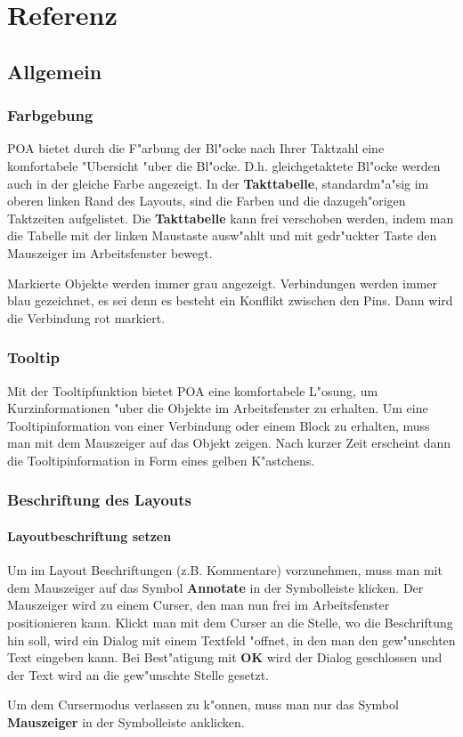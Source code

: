 \documentclass[a4paper,titlepage,12pt,ngerman]{scrbook}
\begin{document}
\chapter{Referenz}

\section{Allgemein}
\subsection{Farbgebung}
POA bietet durch die F"arbung der Bl"ocke nach Ihrer Taktzahl eine komfortabele "Ubersicht "uber die Bl"ocke. D.h. gleichgetaktete Bl"ocke werden auch in der gleiche Farbe angezeigt.\newline
In der {\bf Takttabelle}, standardm"a"sig im oberen linken Rand des Layouts, sind die Farben und die dazugeh"origen Taktzeiten aufgelistet. Die {\bf Takttabelle} kann frei verschoben werden, indem man die Tabelle mit der linken Maustaste ausw"ahlt und mit gedr"uckter Taste den Mauszeiger im Arbeitsfenster bewegt.\par
Markierte Objekte werden immer grau angezeigt.\newline
Verbindungen werden immer blau gezeichnet, es sei denn es besteht ein Konflikt zwischen den Pins. Dann wird die Verbindung rot markiert.


\subsection{Tooltip}
Mit der Tooltipfunktion bietet POA eine komfortabele L"osung, um Kurzinformationen "uber die Objekte im Arbeitsfenster zu erhalten. Um eine Tooltipinformation von einer Verbindung oder einem Block zu erhalten, muss man mit dem Mauszeiger auf das Objekt zeigen. Nach kurzer Zeit erscheint dann die Tooltipinformation in Form eines gelben K"astchens.

\subsection{Beschriftung des Layouts}
\subsubsection{Layoutbeschriftung setzen}
Um im Layout Beschriftungen (z.B. Kommentare) vorzunehmen, muss man mit dem Mauszeiger auf das Symbol {\bf Annotate} in der Symbolleiste klicken.%
Der Mauszeiger wird zu einem Curser, den man nun frei im Arbeitsfenster positionieren kann. Klickt man mit dem Curser an die Stelle, wo die Beschriftung hin soll, wird ein Dialog mit einem Textfeld "offnet, in den man den gew"unschten Text eingeben kann. Bei Best"atigung mit {\bf OK} wird der Dialog geschlossen und der Text wird an die gew"unschte Stelle gesetzt.\par
Um dem Cursermodus verlassen zu k"onnen, muss man nur das Symbol {\bf Mauszeiger} in der Symbolleiste anklicken.
\end{document}

